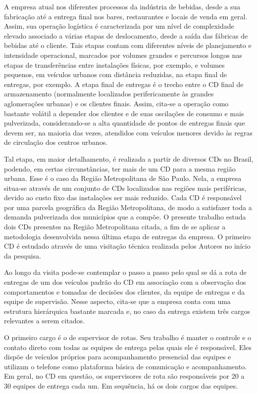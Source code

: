 A empresa atual nos diferentes processos da indústria de bebidas, desde a sua fabricação até a entrega final nos bares, restaurantes e locais de venda em geral.
Assim, sua operação logística é caracterizada por um nível de complexidade elevado associado a várias etapas  de deslocamento, desde a saída das fábricas de bebidas até o cliente.
Tais etapas contam com diferentes níveis de planejamento e intensidade operacional, marcados por volumes grandes e percursos longos nas etapas de transferências entre instalações físicas, por exemplo, e volumes pequenos, em veículos urbanos com distância reduzidas, na etapa final de entregas, por exemplo.
A etapa final de entregas é o trecho entre o CD final de armazenamento (normalmente localizados perifericamente às grandes aglomerações urbanas) e os clientes finais.
Assim, cita-se a operação como bastante volátil a depender dos clientes e de suas oscilações de consumo e mais pulverizada, considerando-se a alta quantidade de pontos de entregas finais que devem ser, na maioria das vezes, atendidos com veículos menores devido às regras de circulação dos centros urbanos.

Tal etapa, em maior detalhamento, é realizada a partir de diversos CDs no Brasil, podendo, em certas circunstâncias, ter mais de um CD para a mesma região urbana.
Esse é o caso da Região Metropolitana de São Paulo.
Nela, a empresa situa-se através de um conjunto de CDs localizados nas regiões mais periféricas, devido ao custo fixo das instalações ser mais reduzido.
Cada CD é responsável por uma parcela geográfica da Região Metropolitana, de modo a satisfazer toda a demanda pulverizada dos municípios que a compõe.
O presente trabalho estuda dois CDs presentes na Região Metropolitana citada, a fim de se aplicar a metodologia desenvolvida nessa última etapa de entregas da empresa.
O primeiro CD é estudado através de uma visitação técnica realizada pelos Autores no início da pesquisa.

Ao longo da visita pode-se contemplar o passo a passo pelo qual se dá a rota de entregas de um dos veículos padrão do CD em associação com a observação dos comportamentos e tomadas de decisões dos clientes, da equipe de entregas e da equipe de supervisão.
Nesse aspecto, cita-se que a empresa conta com uma estrutura hierárquica bastante marcada e, no caso da entrega existem três cargos relevantes a serem citados. 

O primeiro cargo é o de supervisor de rotas. Seu trabalho é manter o controle e o contato direto com todas as equipes de entrega pelas quais ele é responsável.
Eles dispõe de veículos próprios para acompanhamento presencial das equipes e utilizam o telefone como plataforma básica de comunicação e acompanhamento. Em geral, no CD em questão, os supervisores de rota são responsáveis por 20 a 30 equipes de entrega cada um.
Em sequência, há os dois cargos das equipes.

